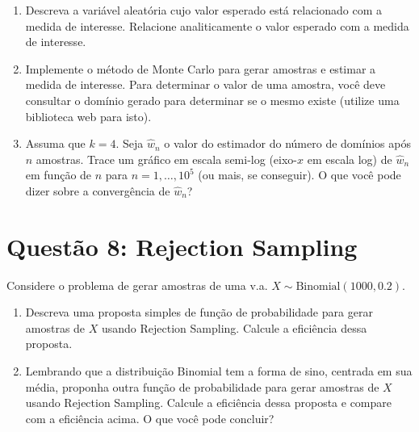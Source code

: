 \documentclass[12 pt]{article}
\begin{document}
\begin{enumerate}
    \item Descreva a variável aleatória cujo valor esperado está relacionado com a medida de interesse. Relacione analiticamente o valor esperado com a medida de interesse.
    \begin{tcolorbox}[colframe=black, title=Resposta:]

    \end{tcolorbox}
    \item Implemente o método de Monte Carlo para gerar amostras e estimar a medida de interesse. Para determinar o valor de uma amostra, você deve consultar o domínio gerado para determinar se o mesmo existe (utilize uma biblioteca web para isto).
    \begin{tcolorbox}[colframe=black, title=Resposta:]

    \end{tcolorbox}
    \item Assuma que $k = 4$. Seja $\hat{w}_n$ o valor do estimador do número de domínios após $n$ amostras. Trace um gráfico em escala semi-log (eixo-$x$ em escala log) de $\hat{w}_n$ em função de $n$ para $n = 1, \dots, 10^5$ (ou mais, se conseguir). O que você pode dizer sobre a convergência de $\hat{w}_n$?
    \begin{tcolorbox}[colframe=black, title=Resposta:]

    \end{tcolorbox}
\end{enumerate}

\section*{Questão 8: Rejection Sampling}

Considere o problema de gerar amostras de uma v.a. $X \sim \text{Binomial}(1000, 0.2)$.

\begin{enumerate}
    \item Descreva uma proposta simples de função de probabilidade para gerar amostras de $X$ usando Rejection Sampling. Calcule a eficiência dessa proposta.
    \begin{tcolorbox}[colframe=black, title=Resposta:]

    \end{tcolorbox}
    \item Lembrando que a distribuição Binomial tem a forma de sino, centrada em sua média, proponha outra função de probabilidade para gerar amostras de $X$ usando Rejection Sampling. Calcule a eficiência dessa proposta e compare com a eficiência acima. O que você pode concluir?
    \begin{tcolorbox}[colframe=black, title=Resposta:]

    \end{tcolorbox}
\end{enumerate}
\end{document}

